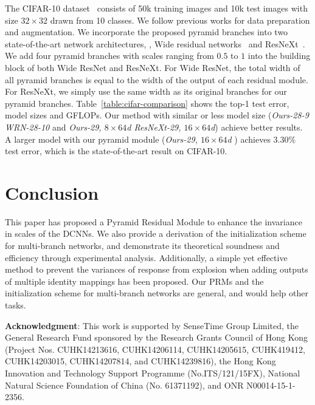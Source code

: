 \documentclass[10pt,twocolumn,letterpaper]{article}
\newcommand{\smalltitle}[1]{\vspace{0.2em}\noindent \textbf{{#1}}}
\begin{document}
The CIFAR-10 dataset~\cite{krizhevsky2009learning} consists of 50k training images and 10k test images with size $32 \times 32$ drawn from 10 classes. 
We follow previous works for data preparation and augmentation. 
We incorporate the proposed pyramid branches into two state-of-the-art network architectures, \ie, Wide residual networks~\cite{zagoruyko2016WRN} and ResNeXt~\cite{xie2016aggregated}. 
We add four pyramid branches with scales ranging from $0.5$ to $1$ into the building block of both Wide ResNet and ResNeXt. 
For Wide ResNet, the total width of all pyramid branches is equal to the width of the output of each residual module.   
For ResNeXt, we simply use the same width as its original branches for our pyramid branches. 
Table~\ref{table:cifar-comparison} shows the top-1 test error, model sizes and GFLOPs. 
Our method with similar or less model size (\textit{Ours-28-9 \vs WRN-28-10} and \textit{Ours-29, $8\times 64$d \vs ResNeXt-29, $16\times 64$d}) achieve better results. A larger model with our pyramid module (\textit{Ours-29, $16\times 64$d	}) achieves $3.30\%$ test error, which is the state-of-the-art result on CIFAR-10. 

\section{Conclusion}
This paper has proposed a Pyramid Residual Module to enhance the invariance in scales of the DCNNs. 
We also provide a derivation of the initialization scheme for multi-branch networks, and demonstrate its theoretical soundness and efficiency through experimental analysis. 
Additionally, a simple yet effective method to prevent the variances of response from explosion when adding outputs of multiple identity mappings has been proposed. 
Our PRMs and the initialization scheme for multi-branch networks are general, and would help other tasks.

\smalltitle{Acknowledgment}: 
This work is supported by SenseTime Group Limited, the General Research Fund sponsored by the Research Grants Council of Hong Kong (Project Nos. CUHK14213616, CUHK14206114, CUHK14205615, CUHK419412, CUHK14203015, CUHK14207814, and CUHK14239816), the Hong Kong Innovation and Technology Support Programme (No.ITS/121/15FX), National Natural Science Foundation of China (No. 61371192), and ONR N00014-15-1-2356. 

{\small


}
\end{document}
